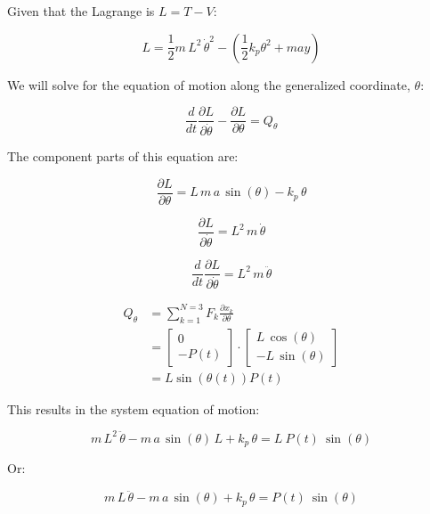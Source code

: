 \documentclass[12pt, letterpaper]{../assignment}
\begin{document}
Given that the Lagrange is $ L = T - V $:

$$ L = \frac{1}{2}m\,L^2\,{\dot{\theta}}^2 - \left( \frac{1}{2} k_p \theta^2 + m a y \right)$$

We will solve for the equation of motion along the generalized coordinate, $\theta$:

$$ \frac{d}{d t} \frac{\partial L}{\partial \dot{\theta}} - \frac{\partial L}{\partial \theta} = Q_\theta $$

The component parts of this equation are:

$$ \frac{\partial L}{\partial \theta} = 
L\,m\,a\,\sin\left(\theta \right)-k_{p}\,\theta  $$

$$ \frac{\partial L}{\partial \dot{\theta}}  =
L^2\,m\,\dot{\theta}  $$

$$ \frac{d}{d t} \frac{\partial L}{\partial \dot{\theta}} =
L^2\,m\,\ddot{\theta}  $$

\begin{equation*}
\begin{aligned}
Q_\theta &= \sum_{k=1}^{N=3} F_k \frac{\partial x_k }{\partial \theta}\\
&=\left[\begin{array}{r} 0\\ -P\left(t\right) \end{array}\right] \cdot \left[\begin{array}{r} L\,\cos\left(\theta \right)\\ -L\,\sin\left(\theta \right) \end{array}\right]\\
&= L\sin(\theta(t)) P(t)
\end{aligned}
\end{equation*}

This results in the system equation of motion:

$$ m\,L^2\,\ddot{\theta} -m\,a\,\sin\left(\theta \right)\,L+k_{p}\,\theta  = L\ P(t)\ \sin(\theta)   $$

Or:

$$ m\,L\,\ddot{\theta} -m\,a\,\sin\left(\theta \right)+k_{p}\,\theta  = P(t)\ \sin(\theta)   $$


\end{document}
